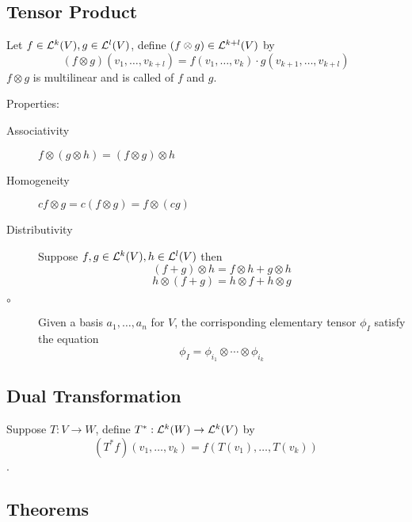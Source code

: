 \subsection{Tensor Product}
Let $f\in{\mathcal L}^k(V), g\in{\mathcal L}^l(V)$,
define $(f\otimes g)\in{\mathcal L}^{k+l}(V)$ by
\[(f\otimes g)(v_1,\ldots,v_{k+l})=f(v_1,\ldots,v_k)\cdot g(v_{k+1},\ldots,v_{k+l})\]
$f\otimes g$ is multilinear and is called  of $f$ and $g$.


Properties:
\begin{description}
\item[Associativity] $f\otimes(g\otimes h)=(f\otimes g)\otimes h$
\item[Homogeneity] $cf\otimes g=c(f\otimes g)=f\otimes (cg)$
\item[Distributivity] Suppose $f,g\in {\mathcal L}^k(V), h\in {\mathcal L}^l(V)$ then
	\[(f+g)\otimes h=f\otimes h+g\otimes h\]
	\[h\otimes (f+g)=h\otimes f+h\otimes g\]
\item[$\circ$] Given a basis $a_1,\ldots,a_n$ for $V$, the corrisponding elementary tensor $\phi_I$ satisfy the equation
\[\phi_I=\phi_{i_1}\otimes\cdots\otimes\phi_{i_k}\]
\end{description}

\subsection{Dual Transformation}
Suppose $T:V\to W$, define  $T^*:{\mathcal L}^k(W)\to{\mathcal L}^k(V)$
by \[(T^*f)(v_1,\ldots,v_k)=f(T(v_1),\ldots,T(v_k))\].


\subsection{Theorems}
\begin{description}
\item[] \TODO
\item[] \TODO
\end{description}